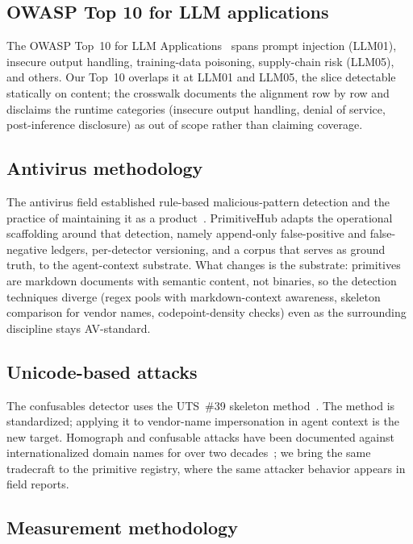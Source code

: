 \subsection{OWASP Top 10 for LLM applications}

The OWASP Top~10 for LLM Applications~\cite{OWASP:2025:llm-top10} spans
prompt injection (LLM01), insecure output handling, training-data
poisoning, supply-chain risk (LLM05), and others. Our Top~10 overlaps it
at LLM01 and LLM05, the slice detectable statically on content; the
crosswalk documents the alignment row by row and disclaims the runtime
categories (insecure output handling, denial of service, post-inference
disclosure) as out of scope rather than claiming coverage.

\subsection{Antivirus methodology}

The antivirus field established rule-based malicious-pattern detection
and the practice of maintaining it as a
product~\cite{Christodorescu:2003:static-malware,Alvarez:2014:yara}.
PrimitiveHub adapts the operational scaffolding around that detection,
namely append-only false-positive and false-negative ledgers,
per-detector versioning, and a corpus that serves as ground truth, to the
agent-context substrate. What changes is the substrate: primitives are
markdown documents with semantic content, not binaries, so the detection
techniques diverge (regex pools with markdown-context awareness, skeleton
comparison for vendor names, codepoint-density checks) even as the
surrounding discipline stays AV-standard.

\subsection{Unicode-based attacks}

The confusables detector uses the UTS~\#39 skeleton
method~\cite{UTS39:2024:unicode-confusables}. The method is
standardized; applying it to vendor-name impersonation in agent context
is the new target. Homograph and confusable attacks have been documented
against internationalized domain names for over two
decades~\cite{Gabrilovich:2002:homograph}; we bring the same tradecraft
to the primitive registry, where the same attacker behavior appears in
field reports.

\subsection{Measurement methodology}

